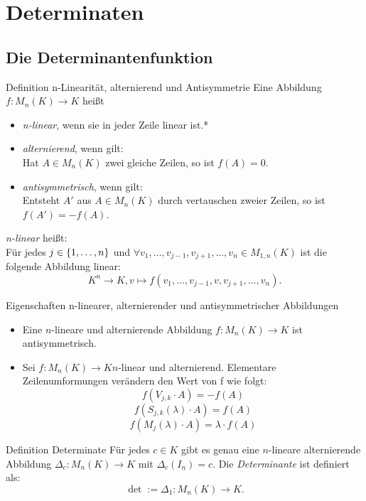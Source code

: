 \documentclass[main.tex]{subfiles}
\begin{document}
\section*{Determinaten}

\subsection*{Die Determinantenfunktion}

\begin{karte}{Definition n-Linearität, alternierend und Antisymmetrie}
    Eine Abbildung \(f: M_n(K) \rightarrow K\) heißt
    \begin{itemize}
        \item \textit{n-linear}, wenn sie in jeder Zeile linear ist.*
        \item \textit{alternierend}, wenn gilt: \\
        Hat \(A \in M_n(K)\) zwei gleiche Zeilen, so ist  \(f(A) = 0\).
       \item \textit{antisymmetrisch}, wenn gilt:\\
        Entsteht \(A'\) aus \(A \in M_n(K)\) durch vertauschen zweier
        Zeilen, so ist \(f(A') = -f(A)\).
    \end{itemize}
    \textit{n-linear} heißt: \\
    Für jedes \(j \in \{1,\ldots,n\}\) und \(\forall v_1, 
    \ldots,v_{j-1},v_{j+1},\ldots,v_n \in M_{1,n}(K)\) ist 
    die \\ 
    folgende Abbildung linear:
    \[K^n \rightarrow K, v \mapsto f(v_1, \ldots,v_{j-1},v,v_{j+1},\ldots,v_n).\]
\end{karte}
\begin{karte}{Eigenschaften n-linearer, alternierender und antisymmetrischer Abbildungen}
    \begin{itemize}
        \item Eine \(n\)-lineare und alternierende Abbildung 
        \(f: M_n(K) \rightarrow K\) ist antisymmetrisch.
        \item Sei \(f: M_n(K) \rightarrow K n\)-linear und alternierend.
        Elementare Zeilenumformungen verändern den Wert von f wie folgt: 
        \[f(V_{j,k} \cdot A) = -f(A)\]
        \[f(S_{j,k}(\lambda) \cdot A) = f(A)\]
        \[f(M_j(\lambda) \cdot A) = \lambda \cdot f(A)\]
    \end{itemize}
\end{karte}
\begin{karte}{Definition Determinate}
    Für jedes \(c \in K\) gibt es genau eine \(n\)-lineare alternierende
    Abbildung \(\Delta_c: M_n(K) \rightarrow K\) mit \(\Delta_c(I_n) = c \).
    Die \textit{Determinante} ist definiert als: 
    \[\det := \Delta_1: M_n(K) \rightarrow K.\]
\end{karte}
\end{document}
